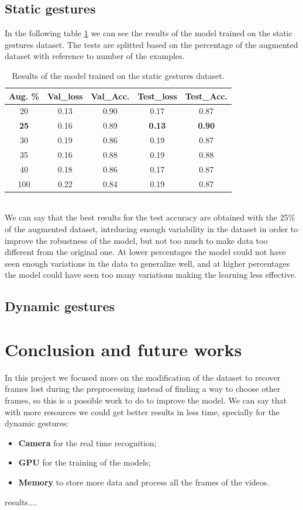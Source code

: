 \documentclass[10pt,twocolumn,letterpaper]{article}
\begin{document}
\subsection{Static gestures}
In the following table \ref{tab:staticGestures} we can see the results of the model 
trained on the static gestures dataset. 
The tests are splitted based on the percentage of the augmented dataset with reference to number of the examples.
\begin{table}[h]
   \begin{center}
   \begin{tabular}{|c|c|c|c|c|}
   \hline
   \textbf{Aug. \%} & \textbf{Val\_loss} & \textbf{Val\_Acc.} & \textbf{Test\_loss} & \textbf{Test\_Acc.}\\
   \hline\hline
   20 & 0.13 & 0.90 & 0.17 & 0.87 \\
   \textbf{25} & 0.16 & 0.89 & \textbf{0.13} & \textbf{0.90} \\
   30 & 0.19 & 0.86 & 0.19 & 0.87 \\
   35 & 0.16 & 0.88 & 0.19 & 0.88 \\
   40 & 0.18 & 0.86 & 0.17 & 0.87 \\
   100 & 0.22 & 0.84 & 0.19 & 0.87 \\ 
   \hline
   \end{tabular}
   \end{center}
   \caption{Results of the model trained on the static gestures dataset.}
   \label{tab:staticGestures}
\end{table} \\
We can say that the best results for the test accuracy are obtained with the 25\% of the 
augmented dataset, intrducing enough variability in the dataset in order to 
improve the robustness of the model, but not too much to make data too different from the original one.
At lower percentages the model could not have seen enough variations in the data to generalize well, and at 
higher percentages the model could have seen too many variations making the learning less effective.
\subsection{Dynamic gestures}
\section{Conclusion and future works}
In this project we focused more on the modification of the dataset to recover frames lost during the preprocessing
instead of finding a way to choose other frames, so this is a possible work to do to improve the model.
We can say that with more resources we could get better results in less time, specially for the dynamic gestures:
\begin{itemize}
   \item \textbf{Camera} for the real time recognition;
   \item \textbf{GPU} for the training of the models;
   \item \textbf{Memory} to store more data and process all the frames of the videos.
\end{itemize}
results....

{\small


}
\end{document}
